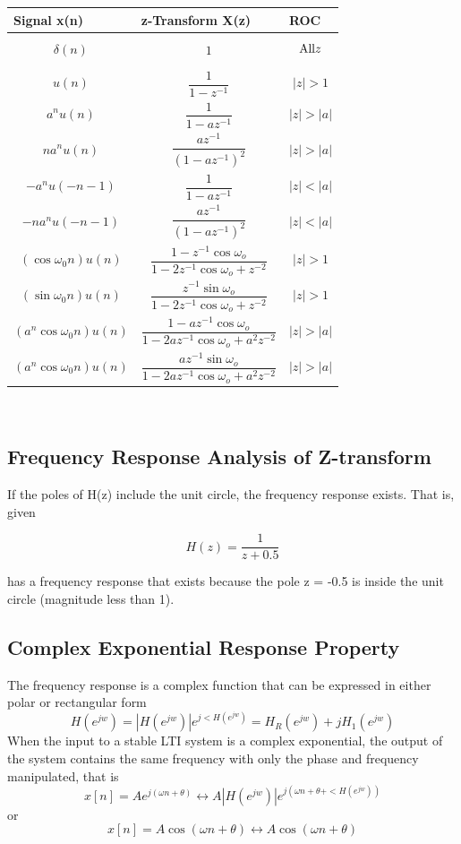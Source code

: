 \documentclass{article}
\begin{document}
\begin{tabularx}{\textwidth}{|X|X|X|}
\hline
\textbf{Signal x(n)} & \textbf{z-Transform X(z)} & \textbf{ROC} \\
\hline
$$\delta(n)$$ & $$1$$ & $$\text{All} \space \space \space \space z $$\\
\hline
$$u(n)$$ & $$\frac{1}{1-z^{-1}}$$ & $$|z| > 1 $$  \\
\hline
$$a^nu(n)$$ & $$\frac{1}{1-az^{-1}}$$ & $$|z| > |a|$$   \\
\hline
$$na^nu(n)$$ & $$\frac{az^{-1}}{(1-az^{-1})^2}$$ & $$|z| > |a|$$ \\
\hline
$$-a^nu(-n-1)$$ & $$\frac{1}{1-az^{-1}}$$ & $$|z| < |a|$$ \\
\hline
$$-na^nu(-n-1)$$ & $$\frac{az^{-1}}{(1-az^{-1})^2}$$ & $$|z| < |a|$$  \\
\hline
$$(\cos\omega_0n)u(n)$$ & $$\frac{1-z^{-1}\cos\omega_o}{1-2z^{-1}\cos\omega_o+z^{-2}}$$ & $$|z| > 1$$ \\
\hline
$$(\sin\omega_0n)u(n)$$ & $$\frac{z^{-1}\sin\omega_o}{1-2z^{-1}\cos\omega_o+z^{-2}}$$ & $$|z| > 1$$  \\
\hline
$$(a^n\cos\omega_0n)u(n)$$ & $$\frac{1-az^{-1}\cos\omega_o}{1-2az^{-1}\cos\omega_o+a^2z^{-2}}$$ & $$|z| > |a|$$   \\
\hline
$$(a^n\cos\omega_0n)u(n)$$ & $$\frac{az^{-1}\sin\omega_o}{1-2az^{-1}\cos\omega_o+a^2z^{-2}}$$ & $$|z| > |a|$$ \\
\hline

\end{tabularx} \\    
\subsection{Frequency Response Analysis of Z-transform}
If the poles of H(z) include the unit circle, the frequency response exists. That is, given 
\begin{center}
$$H(z) = \frac{1}{z+0.5}$$
\end{center}
has a frequency response that exists because the pole z = -0.5 is inside the unit circle (magnitude less than 1). 
\subsection{Complex Exponential Response Property}
The frequency response is a complex function that can be expressed in either polar or rectangular form
\begin{equation}
H(e^{jw})=|H(e^{jw})|e^{j<H(e^{jw})}=H_R(e^{jw})+jH_1(e^{jw})
\end{equation}
When the input to a stable LTI system is a complex exponential, the output of the system contains the same frequency with only the phase and frequency manipulated, that is 
\begin{equation}
x[n] = Ae^{j(\omega n+\theta)}\leftrightarrow  A|H(e^{jw})|e^{j(\omega n+\theta+<H(e^{jw}))}
\end{equation}
or
\begin{equation}
x[n] = A\cos(\omega n +\theta) \leftrightarrow A\cos(\omega n + \theta)
\end{equation}
\end{document}
